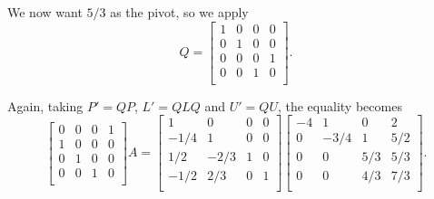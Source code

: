 \documentclass[11pt]{article}
\newcommand{\1}{\mathbf{1}}
\newcommand{\0}{\mathbf{0}}
\begin{document}
We now want $5/3$ as the pivot, so we apply
\[
Q =
\begin{bmatrix}
  1	&  0	&  0	&  0 \\
  0	&  1	&  0	&  0 \\
  0	&  0	&  0	&  1 \\
  0	&  0	&  1	&  0 \\
\end{bmatrix}
.
\]

Again, taking $P' = Q P$, $L' = Q L Q$ and $U' = QU$, the equality becomes
\[
\begin{bmatrix}
  0	&  0	&  0	&  1 \\
  1	&  0	&  0	&  0 \\
  0	&  1	&  0	&  0 \\
  0	&  0	&  1	&  0 \\
\end{bmatrix}
A
=
\begin{bmatrix}
  1	&  0	&  0	&  0 \\
 -1/4	&  1	&  0	&  0 \\
  1/2	& -2/3	&  1	&  0 \\
 -1/2	&  2/3	&  0	&  1 \\
\end{bmatrix}
\begin{bmatrix}
 -4	&  1	&  0	&  2 \\
  0	& -3/4	&  1	&  5/2 \\
  0	&  0	&  5/3	&  5/3 \\
  0	&  0	&  4/3	&  7/3 \\
\end{bmatrix}
.
\]
\end{document}
